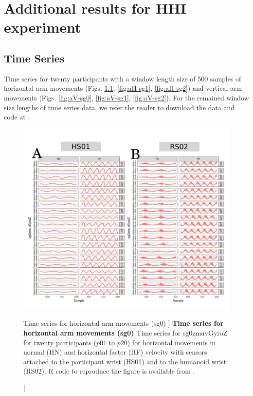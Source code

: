 \chapter{Additional results for HHI experiment} \label{appendix:e}

\graphicspath{{figs/appendixE/PDF/}}


\section{Time Series} \label{appendix:e:ts}

Time series for twenty participants with a window length size of 500 samples
of horizontal arm movements (Figs. \ref{fig:aH-sg0}, \ref{fig:aH-sg1}, \ref{fig:aH-sg2})
and vertical arm movements (Figs. \ref{fig:aV-sg0}, \ref{fig:aV-sg1}, \ref{fig:aV-sg2}).
For the remained window size lengths of time series data, we refer
the reader to download the data and code at \cite{xochicale2018}.
\begin{figure}
\centering
\includegraphics[width=1.0\textwidth]{aH-sg0}
    	\caption
	[Time series for horizontal arm movements (sg0) ]{
	{\bf Time series for horizontal arm movements (sg0)}
		Time series for sg0zmuvGyroZ for twenty participants 
		($p01$ to  $p20$) 
		for horizontal movements in normal (HN) and horizontal faster (HF) 
		velocity with sensors attached to the participant wrist (HS01)
		and to the humanoid wrist (RS02).
	R code to reproduce the figure is available from \cite{xochicale2018}.
        }
    \label{fig:aH-sg0}
\end{figure}

